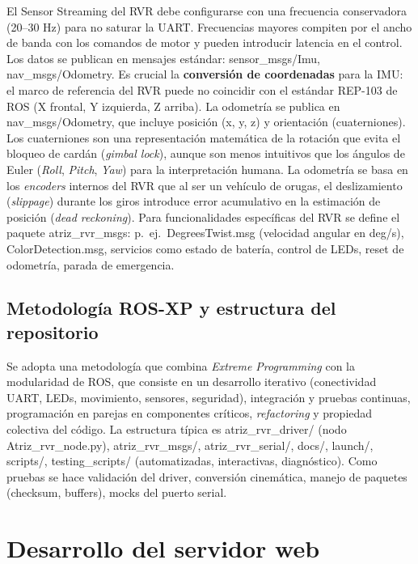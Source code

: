 \documentclass[12pt]{article}
\numberwithin{figure}{section}
\numberwithin{table}{section}
\def\code#1{#1}%
\def\file#1{#1}%
\newcommand{\code}[1]{\textcolor{codeblue}{\url{#1}}}
\newcommand{\file}[1]{\textcolor{darkblue}{\url{#1}}}
\begin{document}
El Sensor Streaming del RVR debe configurarse con una frecuencia conservadora (20--30 Hz) para no saturar la UART. Frecuencias mayores compiten por el ancho de banda con los comandos de motor y pueden introducir latencia en el control. Los datos se publican en mensajes estándar: \code{sensor\_msgs/Imu}, \code{nav\_msgs/Odometry}. Es crucial la \textbf{conversión de coordenadas} para la IMU: el marco de referencia del RVR puede no coincidir con el estándar REP-103 de ROS (X frontal, Y izquierda, Z arriba). La odometría se publica en \code{nav\_msgs/Odometry}, que incluye posición (x, y, z) y orientación (cuaterniones). Los cuaterniones son una representación matemática de la rotación que evita el bloqueo de cardán (\emph{gimbal lock}), aunque son menos intuitivos que los ángulos de Euler (\textit{Roll}, \textit{Pitch}, \textit{Yaw}) para la interpretación humana. La odometría se basa en los \textit{encoders} internos del RVR que al ser un vehículo de orugas, el deslizamiento (\textit{slippage}) durante los giros introduce error acumulativo en la estimación de posición (\textit{dead reckoning}). Para funcionalidades específicas del RVR se define el paquete \code{atriz\_rvr\_msgs}: p.\ ej.\ \code{DegreesTwist.msg} (velocidad angular en deg/s), \code{ColorDetection.msg}, servicios como estado de batería, control de LEDs, reset de odometría, parada de emergencia.


\subsection{Metodología ROS-XP y estructura del repositorio}

Se adopta una metodología que combina \textit{Extreme Programming} con la modularidad de ROS, que consiste en un desarrollo iterativo (conectividad UART, LEDs, movimiento, sensores, seguridad), integración y pruebas continuas, programación en parejas en componentes críticos, \textit{refactoring} y propiedad colectiva del código. La estructura típica es \code{atriz\_rvr\_driver/} (nodo \file{Atriz\_rvr\_node.py}), \code{atriz\_rvr\_msgs/}, \code{atriz\_rvr\_serial/}, \code{docs/}, \code{launch/}, \code{scripts/}, \code{testing\_scripts/} (automatizadas, interactivas, diagnóstico). Como pruebas se hace validación del driver, conversión cinemática, manejo de paquetes (checksum, buffers), mocks del puerto serial.


\section{Desarrollo del servidor web}
\label{sec:servidor_web}
\end{document}
